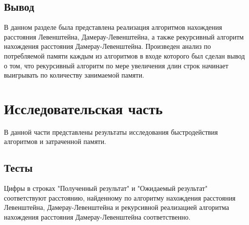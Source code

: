 \documentclass[a4paper, 14pt]{article}
\begin{document}
	\subsection{Вывод}
	
	В данном разделе была представлена реализация алгоритмов нахождения расстояния Левенштейна, Дамерау-Левенштейна, а также рекурсивный алгоритм нахождения расстояния Дамерау-Левенштейна. Произведен анализ по потребляемой памяти каждым из алгоритмов в входе которого был сделан вывод о том, что рекурсивный алгоритм по мере увеличения длин строк начинает выигрывать по количеству занимаемой памяти.
	
	\newpage
	\section{Исследовательская часть}
	В данной части представлены результаты  исследования быстродействия алгоритмов и затраченной памяти.\\
	
	\subsection{Тесты}
	
	Цифры в строках "Полученный результат" и "Ожидаемый результат" соответствуют расстоянию, найденному по алгоритму нахождения расстояния Левенштейна, Дамерау-Левенштейна и рекурсивной реализацией алгоритма нахождения расстояния Дамерау-Левенштейна соответственно.\\
	
\end{document}
